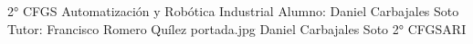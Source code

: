 \documentclass[spanish,openany]{report}
\date{\today}
\begin{document}
{ 2° CFGS Automatización y Robótica Industrial}
{Alumno: Daniel Carbajales Soto\\
	Tutor: Francisco Romero Quílez
}
{portada.jpg}
\maketoc
{}
{Daniel Carbajales Soto}
{2° CFGSARI}
%



\end{document}
